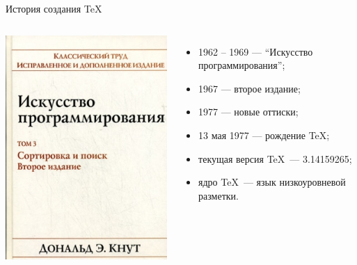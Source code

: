 \begin{frame}{История создания \TeX}
    \begin{columns}
        \centering
        \includegraphics[width=1\linewidth]{../Figures/art.jpg}
        \begin{itemize}
            \pause\item 1962 -- 1969 --- ``Искусство программирования'';
            \pause\item 1967 --- второе издание;
            \pause\item 1977 --- новые оттиски;
            \pause\item 13 мая 1977 --- рождение \TeX;
            \pause\item текущая версия \TeX~--- 3.14159265;
            \pause\item ядро \TeX~--- язык низкоуровневой разметки.
        \end{itemize}
    \end{columns}
\end{frame}

